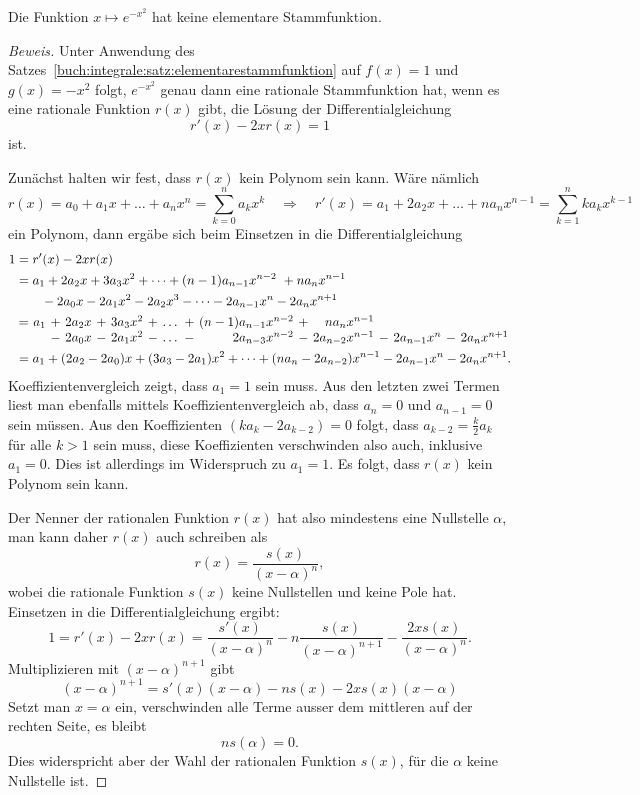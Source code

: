 \begin{satz}
Die Funktion $x\mapsto e^{-x^2}$ hat keine elementare Stammfunktion.
\label{buch:iintegrale:satz:expx2}
\end{satz}

\begin{proof}[Beweis]
Unter Anwendung des Satzes~\ref{buch:integrale:satz:elementarestammfunktion}
auf $f(x)=1$ und $g(x)=-x^2$ folgt, $e^{-x^2}$ genau dann eine rationale 
Stammfunktion hat, wenn es eine rationale Funktion $r(x)$ gibt, die
Lösung der Differentialgleichung
\begin{equation}
r'(x) -2xr(x)=1
\label{buch:integrale:expx2dgl}
\end{equation}
ist.

Zunächst halten wir fest, dass $r(x)$ kein Polynom sein kann.
Wäre nämlich 
\[
r(x)
=
a_0 + a_1x + \dots + a_nx^n
=
\sum_{k=0}^n a_kx^k
\quad\Rightarrow\quad
r'(x)
=
a_1 + 2a_2x + \dots + na_nx^{n-1}
=
\sum_{k=1}^n
ka_kx^{k-1}
\]
ein Polynom, dann ergäbe sich beim Einsetzen in die Differentialgleichung
\begin{align*}
1
&=
r'(x)-2xr(x)
\\
&=
a_1 + 2a_2x + 3a_3x^2 + \dots + (n-1)a_{n-1}x^{n-2} + na_nx^{n-1}
\\
&\qquad
-
2a_0x -2a_1x^2 -2a_2x^3 - \dots - 2a_{n-1}x^n - 2a_nx^{n+1}
\\
&
\hspace{0.7pt}
\renewcommand{\arraycolsep}{1.8pt}
\begin{array}{crcrcrcrcrcrcrcr}
=&a_1&+&2a_2x&+&3a_3x^2&+&\dots&+&(n-1)a_{n-1}x^{n-2}&+&na_{n  }x^{n-1}& &           & & \\
 &   &-&2a_0x&-&2a_1x^2&-&\dots&-&    2a_{n-3}x^{n-2}&-&2a_{n-2}x^{n-1}&-&2a_{n-1}x^n&-&2a_nx^{n+1}
\end{array}
\\
&=
a_1
+
(2a_2-2a_0)x
+
(3a_3-2a_1)x^2
+
\dots
+
(na_n-2a_{n-2})x^{n-1}
-
2a_{n-1}x^n
-
2a_nx^{n+1}.
\end{align*}
Koeffizientenvergleich zeigt, dass $a_1=1$ sein muss.
Aus den letzten zwei Termen liest man ebenfalls mittels Koeffizientenvergleich
ab, dass $a_n=0$ und $a_{n-1}=0$ sein müssen.
Aus den Koeffizienten $(ka_k-2a_{k-2})=0$ folgt, dass
$a_{k-2}=\frac{k}{2}a_k$ für alle $k>1$ sein muss, diese Koeffizienten
verschwinden also auch, inklusive $a_1=0$.
Dies ist allerdings im Widerspruch zu $a_1=1$.
Es folgt, dass $r(x)$ kein Polynom sein kann.

Der Nenner der rationalen Funktion $r(x)$ hat also mindestens eine Nullstelle
$\alpha$, man kann daher $r(x)$ auch schreiben als
\[
r(x) = \frac{s(x)}{(x-\alpha)^n},
\]
wobei die rationale Funktion $s(x)$ keine Nullstellen und keine Pole hat.
Einsetzen in die Differentialgleichung ergibt:
\[
1
=
r'(x) -2xr(x)
=
\frac{s'(x)}{(x-\alpha)^n}
-n
\frac{s(x)}{(x-\alpha)^{n+1}}
-
\frac{2xs(x)}{(x-\alpha)^n}.
\]
Multiplizieren mit $(x-\alpha)^{n+1}$ gibt
\[
(x-\alpha)^{n+1}
=
s'(x)(x-\alpha)
-
ns(x)
-
2xs(x)(x-\alpha)
\]
Setzt man $x=\alpha$ ein, verschwinden alle Terme ausser dem mittleren
auf der rechten Seite, es bleibt
\[
ns(\alpha) = 0.
\]
Dies widerspricht aber der Wahl der rationalen Funktion $s(x)$, für die
$\alpha$ keine Nullstelle ist.


\end{proof}

